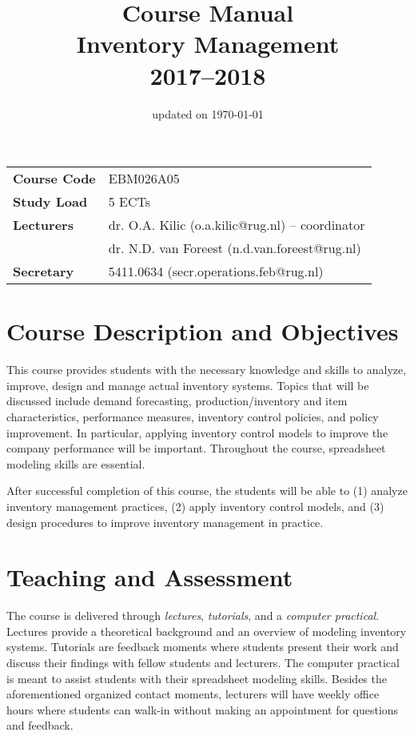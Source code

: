 \documentclass{article}
\title{\bf
	Course Manual \\ 
	Inventory Management \\
	{\normalsize 2017--2018}}
\date{\small updated on \today}
\author{\empty}
\begin{document}
\maketitle

\begin{table}[htbp]
    \begin{tabular}{ll}
    \textbf{Course Code}  	& EBM026A05 \\
    \textbf{Study Load} 	& 5 ECTs \\
    \textbf{Lecturers} 		& dr. O.A. Kilic (o.a.kilic@rug.nl) -- coordinator \\ 
    		  				& dr. N.D. van Foreest (n.d.van.foreest@rug.nl) \\
    \textbf{Secretary} 		& 5411.0634 (secr.operations.feb@rug.nl) \\
    \end{tabular}%
\end{table}%


\setcounter{tocdepth}{2}
\setlength\cftbeforesecskip{2.5pt}
{\small\tableofcontents}

\newpage

\section{Course Description and Objectives}

This course provides students with the necessary knowledge and skills to analyze, improve, design and manage actual inventory systems. Topics that will be discussed include demand forecasting, production/inventory and item characteristics, performance measures, inventory control policies, and policy improvement. In particular, applying inventory control models to improve the company performance will be important. Throughout the course, spreadsheet modeling skills are essential.

After successful completion of this course, the students will be able to (1) analyze inventory management practices, (2) apply inventory control models, and (3) design procedures to improve inventory management in practice.


\section{Teaching and Assessment}

The course is delivered through \textit{lectures}, \textit{tutorials}, and a \textit{computer practical}. Lectures provide a theoretical background and an overview of modeling inventory systems. Tutorials are feedback moments where students present their work and discuss their findings with fellow students and lecturers. The computer practical is meant to assist students with their spreadsheet modeling skills. Besides the aforementioned organized contact moments, lecturers will have weekly office hours where students can walk-in without making an appointment for questions and feedback. 
 
\end{document}

